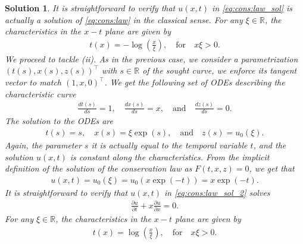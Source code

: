 \documentclass[10pt,letterpaper]{article}
\theoremstyle{break}
\newtheorem{solution}{Solution}
\begin{document}
\begin{solution}
	It is straightforward to verify that $u(x,t)$ in \eqref{eq:cons:law_sol}
	is actually a solution of \eqref{eq:cons:law} in the classical sense. 
	For any $\xi \in \mathbb{R}$, the characteristics in the $x-t$ plane are given by
	\begin{align}
		t(x)
		=
		-
		\log
		\left(
			\frac{x}{\xi}
		\right),
		\quad
		\text{for}
		\quad
		x \xi>0.
	\end{align}
	We proceed to tackle (ii).
	As in the previous case, we consider a parametrization
	$(t(s),x(s),z(s))^\top$ with $s \in \mathbb{R}$ of the sought curve, we enforce its tangent 
	vector to match $ (1,x,0)^\top$. We get the following set of ODEs
	describing the characteristic curve
	\begin{align}
		\frac{dt(s)}{ds} =1,
		\quad
		\frac{dx(s)}{ds} =x,
		\quad
		\text{and}
		\quad
		\frac{dz(s)}{ds} =0.
	\end{align}
	The solution to the ODEs are
	\begin{align}
		t(s) =s,
		\quad
		x(s) = \xi \exp(s),
		\quad
		\text{and}
		\quad
		z(s) = u_0(\xi).
	\end{align}
	Again, the parameter $s$ it is 
	actually equal to the temporal variable $t$, and
	the solution $u(x,t)$ is constant along the characteristics.
	From the implicit definition of the solution of the conservation law
	as $F(t,x,z) =0$, we get that 
	\begin{align}\label{eq:cons:law_sol_2}
		u(x,t) = u_0(\xi) = u_0(x \exp(-t)) = x \exp(-t).
	\end{align}
	It is straightforward to verify that $u(x,t)$ in \eqref{eq:cons:law_sol_2}
	solves
	\begin{align}
		\frac{\partial u}{\partial t}
		+
		x
		\frac{\partial u}{\partial x}
		= 0.
	\end{align}
	For any $\xi \in \mathbb{R}$, the characteristics in the $x-t$ plane are given by
	\begin{align}
		t(x)
		=
		\log
		\left(
			\frac{x}{\xi}
		\right),
		\quad
		\text{for}
		\quad
		x \xi>0.
	\end{align}
\end{solution}
\end{document}
